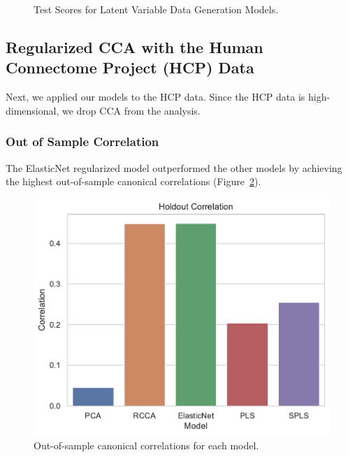 \begin{figure}
\centering
\begin{subfigure}{0.49\linewidth}
\centering

\caption{}
\end{subfigure}
%
\begin{subfigure}{0.49\linewidth}
\centering

\caption{}
\end{subfigure}
\caption{Test Scores for Latent Variable Data Generation Models.}
\label{fig:latent-variable-scores-high}
\end{figure}

\subsection{Regularized CCA with the Human Connectome Project (HCP) Data}

Next, we applied our models to the HCP data. Since the HCP data is high-dimensional, we drop CCA from the analysis.

\subsubsection{Out of Sample Correlation}

The ElasticNet regularized model outperformed the other models by achieving the highest out-of-sample canonical correlations (Figure~\ref{fig:performance}).

\begin{figure}
\centering
\includegraphics[width=0.5\linewidth]{figures/regularization/hcp/holdout_correlations.pdf}
\caption{Out-of-sample canonical correlations for each model.}
\label{fig:performance}
\end{figure}

%


